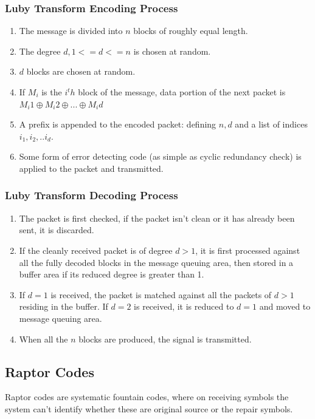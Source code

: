 \subsubsection{Luby Transform Encoding Process}
\begin{enumerate}
    \item
        The message is divided into $n$ blocks of roughly equal length.
    \item
        The degree $ d, 1 <= d <= n $ is chosen at random.
    \item
        $ d$ blocks are chosen at random.
    \item
        If $M_i$ is the $i^th$ block of the message, data portion of the next
        packet is $M_i1 \oplus M_i2 \oplus ... \oplus M_id $
    \item
        A prefix is appended to the encoded packet: defining $n,d$ and a list of
        indices $i_1, i_2, .. i_d$.
    \item
        Some form of error detecting code (as simple as cyclic redundancy check)
        is applied to the packet and transmitted.
\end{enumerate}

\subsubsection{Luby Transform Decoding Process}
\begin{enumerate}
    \item The packet is first checked, if the packet isn't clean or it has
        already been sent, it is discarded.
    \item 
        If the cleanly received packet is of degree $d > 1$, it is first
        processed against all the fully decoded blocks in the message queuing
        area, then stored in a buffer area if its reduced degree is greater than
        1.
    \item
        If $d=1$ is received, the packet is matched against all the packets of
        $d>1$ residing in the buffer. If $d=2$ is received, it is reduced to
        $d=1$ and moved to message queuing area.
    \item When all the $n$ blocks are produced, the signal is transmitted.
\end{enumerate}


\subsection{Raptor Codes}
Raptor codes are systematic fountain codes, where on receiving symbols the
system can't identify whether these are original source or the repair symbols.

